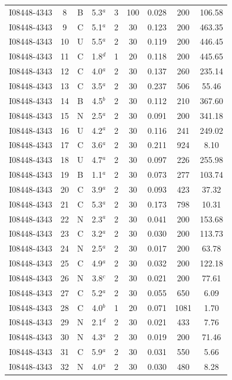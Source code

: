 \begin{table}
\begin{tabular}{ccccccccc}
I08448-4343 & 8 & B & 5.3$^{a}$ & 3 & 100 & 0.028 & 200 & 106.58 \\
I08448-4343 & 9 & C & 5.1$^{a}$ & 2 & 30 & 0.123 & 200 & 463.35 \\
I08448-4343 & 10 & U & 5.5$^{a}$ & 2 & 30 & 0.119 & 200 & 446.45 \\
I08448-4343 & 11 & C & 1.8$^{d}$ & 1 & 20 & 0.118 & 200 & 445.65 \\
I08448-4343 & 12 & C & 4.0$^{a}$ & 2 & 30 & 0.137 & 260 & 235.14 \\
I08448-4343 & 13 & C & 3.5$^{a}$ & 2 & 30 & 0.237 & 506 & 55.46 \\
I08448-4343 & 14 & B & 4.5$^{b}$ & 2 & 30 & 0.112 & 210 & 367.60 \\
I08448-4343 & 15 & N & 2.5$^{a}$ & 2 & 30 & 0.091 & 200 & 341.18 \\
I08448-4343 & 16 & U & 4.2$^{a}$ & 2 & 30 & 0.116 & 241 & 249.02 \\
I08448-4343 & 17 & C & 3.6$^{a}$ & 2 & 30 & 0.211 & 924 & 8.10 \\
I08448-4343 & 18 & U & 4.7$^{a}$ & 2 & 30 & 0.097 & 226 & 255.98 \\
I08448-4343 & 19 & B & 1.1$^{a}$ & 2 & 30 & 0.073 & 277 & 103.74 \\
I08448-4343 & 20 & C & 3.9$^{a}$ & 2 & 30 & 0.093 & 423 & 37.32 \\
I08448-4343 & 21 & C & 5.3$^{a}$ & 2 & 30 & 0.173 & 798 & 10.31 \\
I08448-4343 & 22 & N & 2.3$^{a}$ & 2 & 30 & 0.041 & 200 & 153.68 \\
I08448-4343 & 23 & C & 3.2$^{a}$ & 2 & 30 & 0.030 & 200 & 113.73 \\
I08448-4343 & 24 & N & 2.5$^{a}$ & 2 & 30 & 0.017 & 200 & 63.78 \\
I08448-4343 & 25 & C & 4.9$^{a}$ & 2 & 30 & 0.032 & 200 & 122.18 \\
I08448-4343 & 26 & N & 3.8$^{c}$ & 2 & 30 & 0.021 & 200 & 77.61 \\
I08448-4343 & 27 & C & 5.2$^{a}$ & 2 & 30 & 0.055 & 650 & 6.09 \\
I08448-4343 & 28 & C & 4.0$^{b}$ & 1 & 20 & 0.071 & 1081 & 1.70 \\
I08448-4343 & 29 & N & 2.1$^{d}$ & 2 & 30 & 0.021 & 433 & 7.76 \\
I08448-4343 & 30 & N & 4.3$^{a}$ & 2 & 30 & 0.019 & 200 & 71.46 \\
I08448-4343 & 31 & C & 5.9$^{a}$ & 2 & 30 & 0.031 & 550 & 5.66 \\
I08448-4343 & 32 & N & 4.0$^{a}$ & 2 & 30 & 0.030 & 480 & 8.28 \\

\end{tabular}
\end{table}
